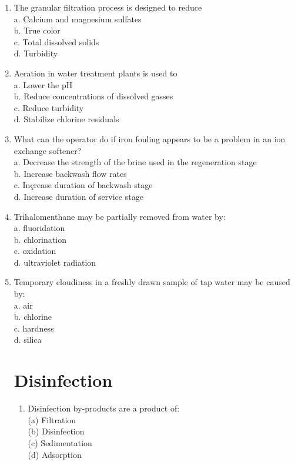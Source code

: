 \documentclass[10pt]{article}
\begin{document}
\begin{enumerate}
\begin{enumerate}
\item The granular filtration process is designed to reduce\\
a. Calcium and magnesium sulfates\\
b. True color\\
c. Total dissolved solids\\
d. Turbidity\item Aeration in water treatment plants is used to\\
a. Lower the $\mathrm{pH}$\\
b. Reduce concentrations of dissolved gasses\\
c. Reduce turbidity\\
d. Stabilize chlorine residuals\\

\item What can the operator do if iron fouling appears to be a problem in an ion exchange softener?\\
a. Decrease the strength of the brine used in the regeneration stage\\
b. Increase backwash flow rates\\
c. Inçrease duration of backwash stage\\
d. Increase duration of service stage\\

\item Trihalomenthane may be partially removed from water by:\\
a. fluoridation\\
b. chlorination\\
c. oxidation\\
d. ultraviolet radiation\\

\item Temporary cloudiness in a freshly drawn sample of tap water may be caused by:\\
a. air\\
b. chlorine\\
c. hardness\\
d. silica\\
\newpage

\section{Disinfection}
\begin{enumerate}
  \item Disinfection by-products are a product of:\\
(a) Filtration\\
(b) Disinfection\\
(c) Sedimentation\\
(d) Adsorption\\


\end{enumerate}
\end{enumerate}
\end{enumerate}
\end{document}
